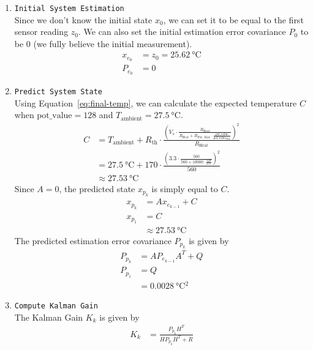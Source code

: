 \documentclass[12pt,a4paper]{article}
\begin{document}
\begin{enumerate}
    \item \texttt{Initial System Estimation} \\
    Since we don't know the initial state $x_0$, we can set it to be equal to the first sensor reading $z_0$. We can also set the initial estimation error covariance $P_0$ to be $0$ (we fully believe the initial measurement).
    \begin{align*}
        x_{e_0} &= z_0 = \SI{25.62}{\degreeCelsius} \\
        P_{e_0} &= 0
    \end{align*}
    \item \texttt{Predict System State} \\
    Using Equation~\eqref{eq:final-temp}, we can calculate the expected temperature $C$ when $\text{pot\_value} = 128$ and $T_{\text{ambient}} = \SI{27.5}{\degreeCelsius}$.
    \begin{align*}
        C &= T_{\text{ambient}} + R_{\text{th}} \cdot \frac{\left(V_s \cdot \frac{R_{\text{Heat}}}{R_{\text{Heat}} + R_{\text{Pot, Max}} \cdot \frac{\text{pot\_value}}{\text{pot\_value}_{\text{Max}}}}\right)^2}{R_{\text{Heat}}} \\
        &= \SI{27.5}{\degreeCelsius} + 170 \cdot \frac{\left(3.3 \cdot \frac{560}{560 + 10000 \cdot \frac{128}{255}}\right)^2}{560} \\
        &\approx \SI{27.53}{\degreeCelsius}
    \end{align*}
    Since $A=0$, the predicted state $x_{p_k}$ is simply equal to $C$.
    \begin{align*}
        x_{p_k} &= A x_{e_{k-1}} + C \\
        x_{p_1} &= C \\
                &\approx \SI{27.53}{\degreeCelsius}
    \end{align*}
    The predicted estimation error covariance $P_{p_k}$ is given by
    \begin{align*}
        P_{p_k} &= A P_{e_{k-1}} A^T + Q \\
        P_{p_1} &= Q \\
                &= \SI{0.0028}{\degreeCelsius^2}
    \end{align*}
    \item \texttt{Compute Kalman Gain} \\
    The Kalman Gain $K_k$ is given by
    \begin{align*}
        K_k &= \frac{P_{p_k} H^T}{H P_{p_k} H^T + R} \\

\end{align*}
\end{enumerate}
\end{document}
